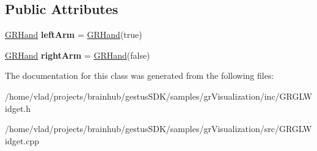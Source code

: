 \subsection*{Public Attributes}
\begin{DoxyCompactItemize}
\item 
\mbox{\label{classGRGLWidget_aed716f1823179bb3124467fbb8498bc7}} 
\mbox{\hyperlink{classGRHand}{G\+R\+Hand}} {\bfseries left\+Arm} = \mbox{\hyperlink{classGRHand}{G\+R\+Hand}}(true)
\item 
\mbox{\label{classGRGLWidget_ab4ffae38fded4e2b13f50afb38675063}} 
\mbox{\hyperlink{classGRHand}{G\+R\+Hand}} {\bfseries right\+Arm} = \mbox{\hyperlink{classGRHand}{G\+R\+Hand}}(false)
\end{DoxyCompactItemize}


The documentation for this class was generated from the following files\+:\begin{DoxyCompactItemize}
\item 
/home/vlad/projects/brainhub/gestus\+S\+D\+K/samples/gr\+Visualization/inc/G\+R\+G\+L\+Widget.\+h\item 
/home/vlad/projects/brainhub/gestus\+S\+D\+K/samples/gr\+Visualization/src/G\+R\+G\+L\+Widget.\+cpp\end{DoxyCompactItemize}
